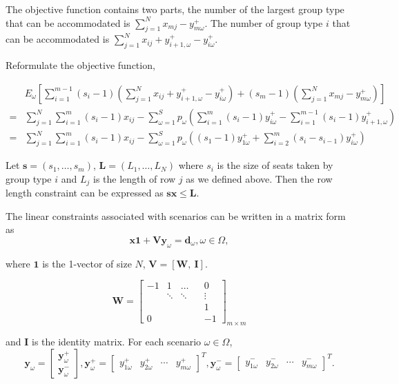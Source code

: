 The objective function contains two parts, the number of the largest group type that can be accommodated is $\sum_{j= 1}^{N} x_{mj} - y_{m \omega}^{+}$. The number of group type $i$ that can be accommodated is $\sum_{j= 1}^{N} x_{ij} + y_{i+1,\omega}^{+} - y_{i \omega}^{+}$.


Reformulate the objective function,

\begin{align*}
  & E_{\omega}\left[\sum_{i=1}^{m-1} (s_i-1) (\sum_{j= 1}^{N} x_{ij} + y_{i+1,\omega}^{+} - y_{i \omega}^{+}) + (s_m-1) (\sum_{j= 1}^{N} x_{mj} - y_{m \omega}^{+})\right] \\
  =& \sum_{j =1}^{N} \sum_{i=1}^m (s_i-1) x_{ij} - \sum_{\omega =1}^{S} p_{\omega} \left(\sum_{i=1}^{m}(s_i-1)y_{i \omega}^{+} - \sum_{i=1}^{m-1}(s_i-1)y_{i+1, \omega}^{+}\right) \\
  =& \sum_{j =1}^{N} \sum_{i=1}^m (s_i-1) x_{ij} - \sum_{\omega =1}^{S} p_{\omega} \left((s_1-1)y_{1 \omega}^{+} + \sum_{i=2}^{m}(s_{i}-s_{i-1}) y_{i \omega}^{+} \right)
\end{align*}



Let $\mathbf{s} = (s_1, \ldots, s_m)$, $\mathbf{L} = (L_1, \ldots, L_N)$ where $s_i$ is the size of seats taken by group type $i$ and $L_j$ is the length of row $j$ as we defined above. Then the row length constraint can be expressed as $\mathbf{s} \mathbf{x} \leq \mathbf{L}$.

The linear constraints associated with scenarios can be written in a matrix form as
\[\mathbf{x} \mathbf{1} + \mathbf{V} \mathbf{y}_\omega = \mathbf{d}_\omega, \omega\in \Omega,\]

where $\mathbf{1}$ is the 1-vector of size $N$, $\mathbf{V} = [\mathbf{W}, ~\mathbf{I}]$.  

$$
\mathbf{W}=\left[\begin{array}{ccccc}
-1 & 1 & \ldots & & 0 \\
& \ddots & \ddots & & \vdots \\
& & & & 1 \\
0 & & & & -1
\end{array}\right]_{m \times m}
$$

and $\mathbf{I}$ is the identity matrix. For each scenario $\omega \in \Omega$,
$$
\mathbf{y}_{\omega}=\left[\begin{array}{l}
\mathbf{y}_{\omega}^{+} \\
\mathbf{y}_{\omega}^{-}
\end{array}\right], \mathbf{y}_{\omega}^{+}=\left[\begin{array}{lllll}y_{1 \omega}^{+} & y_{2 \omega}^{+} & \cdots & y_{m \omega}^{+}\end{array}\right]^{T}, \mathbf{y}_{\omega}^{-}=\left[\begin{array}{llll}y_{1 \omega}^{-} & y_{2 \omega}^{-} & \cdots & y_{m \omega}^{-}\end{array}\right]^{T}.
$$

